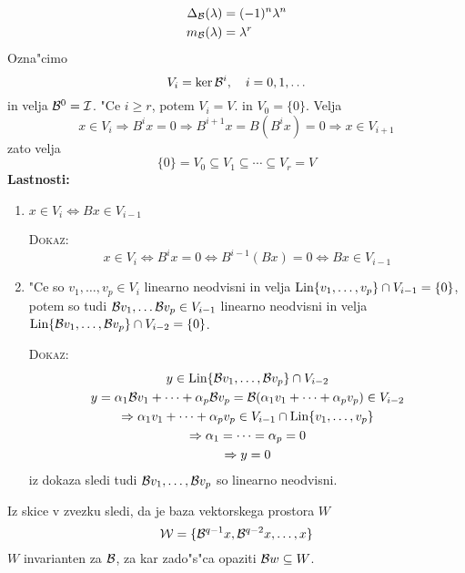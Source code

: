 \begin{align*}
\Delta_{\mathcal{B}} (\lambda) &= (-1)^n \lambda^n \\
m_{\mathcal{B}} (\lambda) &= \lambda^r
\end{align*}
Ozna"cimo
\begin{equation*}
V_i = \ker \mathcal{B}^i, \quad i = 0, 1, \ldots
\end{equation*}
in velja $\mathcal{B}^0 = \mathcal{I}$. "Ce $i \geq r$, potem $V_i = V$. in $V_0 = \{0\}$. Velja
\begin{equation*}
x \in V_i \Rightarrow B^i x = 0 \Rightarrow B^{i+1} x = B(B^i x) = 0 \Rightarrow x \in V_{i + 1}
\end{equation*}
zato velja
\begin{equation*}
\{0\} = V_0 \subseteq V_1 \subseteq \cdots \subseteq V_r = V
\end{equation*}
\textbf{Lastnosti:}
\begin{enumerate}
	\item $x \in V_i \iff Bx \in V_{i-1}$
	
	\textsc{Dokaz:}
	\begin{equation*}
	x \in V_i \iff B^i x = 0 \iff B^{i-1} (Bx) = 0 \iff Bx \in V_{i-1}
	\end{equation*}
	
	\item "Ce so $v_1, \ldots, v_p \in V_i$ linearno neodvisni in velja $\text{Lin} \{v_1, \ldots, v_p\} \cap V_{i-1} = \{0\}$, potem so tudi $\mathcal{B} v_1, \ldots \mathcal{B} v_p \in V_{i-1}$ linearno neodvisni in velja $\text{Lin} \{\mathcal{B} v_1, \ldots, \mathcal{B} v_p\} \cap V_{i-2} = \{0\}$.
	
	\textsc{Dokaz:} 
	\begin{gather*}
		y \in \text{Lin} \{\mathcal{B} v_1, \ldots, \mathcal{B} v_p\} \cap V_{i-2} \\
		y = \alpha_1 \mathcal{B} v_1 + \cdots + \alpha_p \mathcal{B} v_p = \mathcal{B} (\alpha_1 v_1 + \cdots + \alpha_p v_p) \in V_{i-2} \\
		\Rightarrow \alpha_1 v_1 + \cdots + \alpha_p v_p \in V_{i-1} \cap \text{Lin} \{v_1, \ldots, v_p\} \\
		\Rightarrow \alpha_1 = \cdots = \alpha_p = 0 \\
		\Rightarrow y = 0
	\end{gather*}
	iz dokaza sledi tudi $\mathcal{B} v_1, \ldots, \mathcal{B} v_p$ so linearno neodvisni.
\end{enumerate}

Iz skice v zvezku sledi, da je baza vektorskega prostora $W$
\begin{equation*}
\mathcal{W} = \{\mathcal{B}^{q-1}x, \mathcal{B}^{q-2}x, \ldots, x\}
\end{equation*}
$W$ invarianten za $\mathcal{B}$, za kar zado"s"ca opaziti $\mathcal{B} w \subseteq W$.


